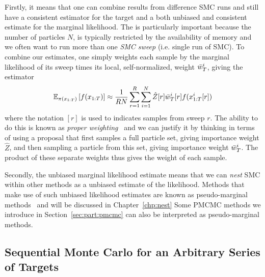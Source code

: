 Firstly, it means that one can combine
results from difference SMC runs and still have a consistent estimator for the target and a both unbiased and
consistent estimate for the marginal likelihood.
The is particularly important because the number of particles $N$, is typically restricted by the availability of memory
and we often want to run more than one \emph{SMC sweep} (i.e. single run of SMC).
To combine our estimates, one simply weights each sample by the marginal likelihood of its sweep times
its local, self-normalized, weight $\bar w_T^i$, giving the estimator
\begin{align}
\label{eq:part:ind-smc}
\mathbb{E}_{\pi (x_{1:T})} \left[f(x_{1:T})\right] \approx \frac{1}{RN} \sum_{r=1}^{R}\sum_{i=1}^{N} \hat{Z}[r] \bar w_T^i[r] f(x_{1:T}^i[r])
\end{align}
where the notation $[r]$ is used to indicates samples from sweep $r$.
 The ability to do this is known as \emph{proper weighting}~\citep{andersson2015nested} and we can justify it by
thinking in terms of using a proposal that first samples a full particle set, giving importance weight $\hat Z$, and then sampling a particle
from this set, giving importance weight $\bar w_T^i$.  The product of these separate weights thus gives the weight of
each sample.  

Secondly, the unbiased marginal likelihood estimate means that we can \emph{nest} SMC within other 
methods as a unbiased estimate of the likelihood.
Methods that make use of such unbiased likelihood estimates are known as pseudo-marginal
methods~\citep{andrieu2009pseudo} and will be discussed in Chapter~\ref{chp:nest}
Some PMCMC methods we introduce in Section~\ref{sec:part:pmcmc} can also be interpreted as pseudo-marginal methods.
%

\subsection{Sequential Monte Carlo for an Arbitrary Series of Targets}
\label{sec:part:smc:arb}

